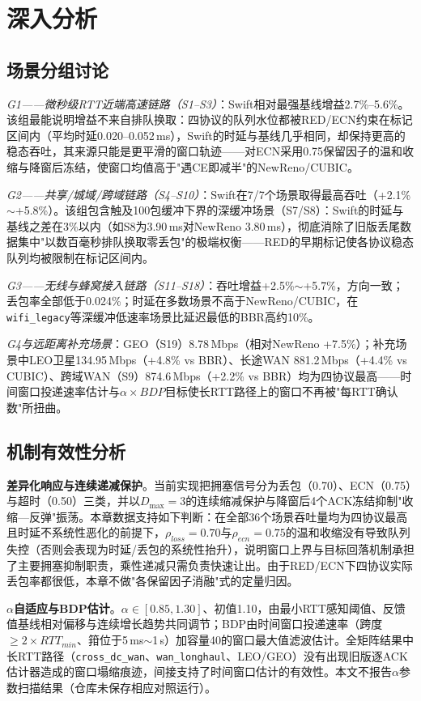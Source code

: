 \section{深入分析}

\subsection{场景分组讨论}

\textit{G1——微秒级RTT近端高速链路（S1--S3）}：Swift相对最强基线增益2.7\%--5.6\%。该组最能说明增益不来自排队换取：四协议的队列水位都被RED/ECN约束在标记区间内（平均时延0.020--0.052\,ms），Swift的时延与基线几乎相同，却保持更高的稳态吞吐，其来源只能是更平滑的窗口轨迹——对ECN采用0.75保留因子的温和收缩与降窗后冻结，使窗口均值高于"遇CE即减半"的NewReno/CUBIC。

\textit{G2——共享/城域/跨域链路（S4--S10）}：Swift在7/7个场景取得最高吞吐（+2.1\%$\sim$+5.8\%）。该组包含触及100包缓冲下界的深缓冲场景（S7/S8）：Swift的时延与基线之差在3\%以内（如S8为3.90\,ms对NewReno 3.80\,ms），彻底消除了旧版丢尾数据集中"以数百毫秒排队换取零丢包"的极端权衡——RED的早期标记使各协议稳态队列均被限制在标记区间内。

\textit{G3——无线与蜂窝接入链路（S11--S18）}：吞吐增益+2.5\%$\sim$+5.7\%，方向一致；丢包率全部低于0.024\%；时延在多数场景不高于NewReno/CUBIC，在\texttt{wifi\_legacy}等深缓冲低速率场景比延迟最低的BBR高约10\%。

\textit{G4与远距离补充场景}：GEO（S19）8.78\,Mbps（相对NewReno +7.5\%）；补充场景中LEO卫星134.95\,Mbps（+4.8\% vs BBR）、长途WAN 881.2\,Mbps（+4.4\% vs CUBIC）、跨域WAN（S9）874.6\,Mbps（+2.2\% vs BBR）均为四协议最高——时间窗口投递速率估计与$\alpha \times BDP$目标使长RTT路径上的窗口不再被"每RTT确认数"所扭曲。

\subsection{机制有效性分析}

\textbf{差异化响应与连续递减保护}。当前实现把拥塞信号分为丢包（0.70）、ECN（0.75）与超时（0.50）三类，并以$D_{\max}=3$的连续缩减保护与降窗后4个ACK冻结抑制"收缩—反弹"振荡。本章数据支持如下判断：在全部36个场景吞吐量均为四协议最高且时延不系统性恶化的前提下，$\rho_{loss}=0.70$与$\rho_{ecn}=0.75$的温和收缩没有导致队列失控（否则会表现为时延/丢包的系统性抬升），说明窗口上界与目标回落机制承担了主要拥塞抑制职责，乘性递减只需负责快速让出。由于RED/ECN下四协议实际丢包率都很低，本章不做"各保留因子消融"式的定量归因。

\textbf{$\alpha$自适应与BDP估计}。$\alpha \in [0.85,1.30]$、初值1.10，由最小RTT感知阈值、反馈值基线相对偏移与连续增长趋势共同调节；BDP由时间窗口投递速率（跨度$\ge 2\times RTT_{min}$、箝位于5\,ms$\sim$1\,s）加容量40的窗口最大值滤波估计。全矩阵结果中长RTT路径（\texttt{cross\_dc\_wan}、\texttt{wan\_longhaul}、LEO/GEO）没有出现旧版逐ACK估计器造成的窗口塌缩痕迹，间接支持了时间窗口估计的有效性。本文不报告$\alpha$参数扫描结果（仓库未保存相应对照运行）。

